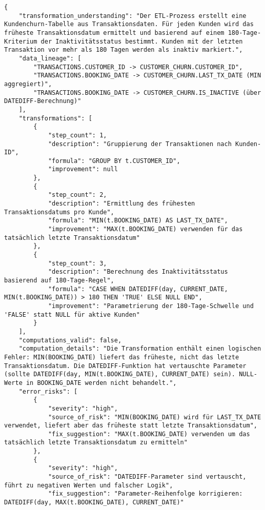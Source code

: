 \begin{lstlisting}[caption={Ausgabe: Claude Sonnet 4 Anwendungsfall 7 Konsistenzdurchlauf},label={claude_case7_prompt2}]
{
    "transformation_understanding": "Der ETL-Prozess erstellt eine Kundenchurn-Tabelle aus Transaktionsdaten. Für jeden Kunden wird das früheste Transaktionsdatum ermittelt und basierend auf einem 180-Tage-Kriterium der Inaktivitätsstatus bestimmt. Kunden mit der letzten Transaktion vor mehr als 180 Tagen werden als inaktiv markiert.",
    "data_lineage": [
        "TRANSACTIONS.CUSTOMER_ID -> CUSTOMER_CHURN.CUSTOMER_ID",
        "TRANSACTIONS.BOOKING_DATE -> CUSTOMER_CHURN.LAST_TX_DATE (MIN aggregiert)",
        "TRANSACTIONS.BOOKING_DATE -> CUSTOMER_CHURN.IS_INACTIVE (über DATEDIFF-Berechnung)"
    ],
    "transformations": [
        {
            "step_count": 1,
            "description": "Gruppierung der Transaktionen nach Kunden-ID",
            "formula": "GROUP BY t.CUSTOMER_ID",
            "improvement": null
        },
        {
            "step_count": 2,
            "description": "Ermittlung des frühesten Transaktionsdatums pro Kunde",
            "formula": "MIN(t.BOOKING_DATE) AS LAST_TX_DATE",
            "improvement": "MAX(t.BOOKING_DATE) verwenden für das tatsächlich letzte Transaktionsdatum"
        },
        {
            "step_count": 3,
            "description": "Berechnung des Inaktivitätsstatus basierend auf 180-Tage-Regel",
            "formula": "CASE WHEN DATEDIFF(day, CURRENT_DATE, MIN(t.BOOKING_DATE)) > 180 THEN 'TRUE' ELSE NULL END",
            "improvement": "Parametrierung der 180-Tage-Schwelle und 'FALSE' statt NULL für aktive Kunden"
        }
    ],
    "computations_valid": false,
    "computation_details": "Die Transformation enthält einen logischen Fehler: MIN(BOOKING_DATE) liefert das früheste, nicht das letzte Transaktionsdatum. Die DATEDIFF-Funktion hat vertauschte Parameter (sollte DATEDIFF(day, MIN(t.BOOKING_DATE), CURRENT_DATE) sein). NULL-Werte in BOOKING_DATE werden nicht behandelt.",
    "error_risks": [
        {
            "severity": "high",
            "source_of_risk": "MIN(BOOKING_DATE) wird für LAST_TX_DATE verwendet, liefert aber das früheste statt letzte Transaktionsdatum",
            "fix_suggestion": "MAX(t.BOOKING_DATE) verwenden um das tatsächlich letzte Transaktionsdatum zu ermitteln"
        },
        {
            "severity": "high",
            "source_of_risk": "DATEDIFF-Parameter sind vertauscht, führt zu negativen Werten und falscher Logik",
            "fix_suggestion": "Parameter-Reihenfolge korrigieren: DATEDIFF(day, MAX(t.BOOKING_DATE), CURRENT_DATE)"

\end{lstlisting}
